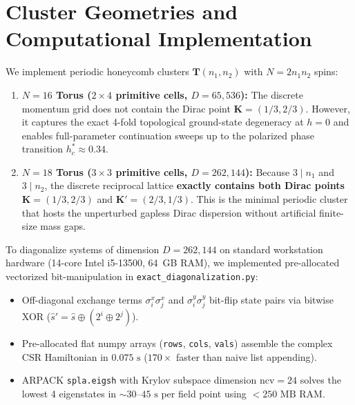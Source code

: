 \section{Cluster Geometries and Computational Implementation}
\label{sec:phase4_ed_clusters}

We implement periodic honeycomb clusters $\mathbf{T}(n_1, n_2)$ with $N = 2 n_1 n_2$ spins:
\begin{enumerate}
    \item \textbf{$N = 16$ Torus ($2 \times 4$ primitive cells, $D = 65{,}536$):} The discrete momentum grid does not contain the Dirac point $\mathbf{K} = (1/3, 2/3)$. However, it captures the exact 4-fold topological ground-state degeneracy at $h=0$ and enables full-parameter continuation sweeps up to the polarized phase transition $h_c^* \approx 0.34$.
    \item \textbf{$N = 18$ Torus ($3 \times 3$ primitive cells, $D = 262{,}144$):} Because $3 \mid n_1$ and $3 \mid n_2$, the discrete reciprocal lattice \textbf{exactly contains both Dirac points} $\mathbf{K} = (1/3, 2/3)$ and $\mathbf{K}' = (2/3, 1/3)$. This is the minimal periodic cluster that hosts the unperturbed gapless Dirac dispersion without artificial finite-size mass gaps.
\end{enumerate}

To diagonalize systems of dimension $D = 262{,}144$ on standard workstation hardware (14-core Intel i5-13500, 64~GB RAM), we implemented pre-allocated vectorized bit-manipulation in \texttt{exact\_diagonalization.py}:
\begin{itemize}
    \item Off-diagonal exchange terms $\sigma_i^x \sigma_j^x$ and $\sigma_i^y \sigma_j^y$ bit-flip state pairs via bitwise XOR ($\hat{s}' = \hat{s} \oplus (2^i \oplus 2^j)$).
    \item Pre-allocated flat numpy arrays (\texttt{rows}, \texttt{cols}, \texttt{vals}) assemble the complex CSR Hamiltonian in $0.075\text{ s}$ ($170\times$ faster than naive list appending).
    \item ARPACK \texttt{spla.eigsh} with Krylov subspace dimension $\mathrm{ncv} = 24$ solves the lowest 4 eigenstates in $\sim 30\text{--}45\text{ s}$ per field point using $<250\text{ MB}$ RAM.
\end{itemize}

